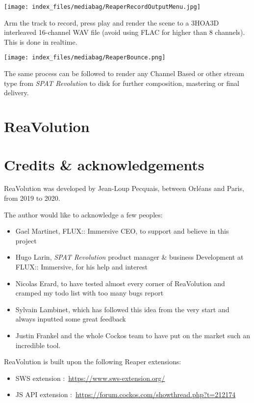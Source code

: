 \documentclass[
  letterpaper,
  DIV=11,
  numbers=noendperiod]{scrreport}
\providecommand{\tightlist}{%
  \setlength{\itemsep}{0pt}\setlength{\parskip}{0pt}}\usepackage{longtable,booktabs,array}
\begin{document}
\texttt{[image: index\_files/mediabag/ReaperRecordOutputMenu.jpg]}

Arm the track to record, press play and render the scene to a 3HOA3D
interleaved 16-channel WAV file (avoid using FLAC for higher than 8
channels). This is done in realtime.

\texttt{[image: index\_files/mediabag/ReaperBounce.png]}

The same process can be followed to render any Channel Based or other
stream type from \emph{SPAT Revolution} to disk for further composition,
mastering or final delivery.

\hypertarget{reavolution-1}{%
\chapter{ReaVolution}\label{reavolution-1}}

\hypertarget{credits-acknowledgements}{%
\chapter{Credits \& acknowledgements}\label{credits-acknowledgements}}

ReaVolution was developed by Jean-Loup Pecquais, between Orléans and
Paris, from 2019 to 2020.

The author would like to acknowledge a few peoples:

\begin{itemize}
\tightlist
\item
  Gael Martinet, FLUX:: Immersive CEO, to support and believe in this
  project
\item
  Hugo Larin, \emph{SPAT Revolution} product manager \& business
  Development at FLUX:: Immersive, for his help and interest
\item
  Nicolas Erard, to have tested almost every corner of ReaVolution and
  cramped my todo list with too many bugs report
\item
  Sylvain Lambinet, which has followed this idea from the very start and
  always inputted some great feedback
\item
  Justin Frankel and the whole Cockos team to have put on the market
  such an incredible tool.
\end{itemize}

ReaVolution is built upon the following Reaper extensions:

\begin{itemize}
\tightlist
\item
  SWS extension :~\url{https://www.sws-extension.org/}
\item
  JS API extension
  :~\url{https://forum.cockos.com/showthread.php?t=212174}
\end{itemize}
\end{document}
